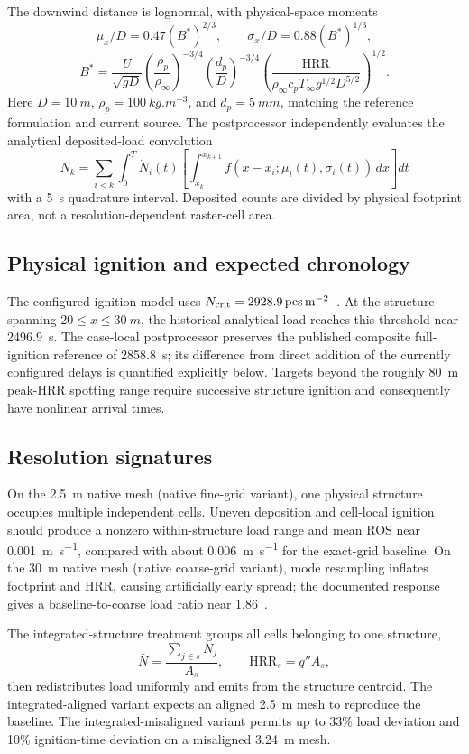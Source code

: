 The downwind distance is lognormal, with physical-space moments
\[
\mu_x/D=0.47(B^*)^{2/3},\qquad \sigma_x/D=0.88(B^*)^{1/3},
\]
\[
B^*=\frac{U}{\sqrt{gD}}
\left(\frac{\rho_p}{\rho_\infty}\right)^{-3/4}
\left(\frac{d_p}{D}\right)^{-3/4}
\left(\frac{\mathrm{HRR}}
{\rho_\infty c_pT_\infty g^{1/2}D^{5/2}}\right)^{1/2}.
\]
Here \(D=\SI{10}{m}\), \(\rho_p=\SI{100}{kg.m^{-3}}\), and
\(d_p=\SI{5}{mm}\), matching the reference formulation and current source. The postprocessor
independently evaluates the analytical deposited-load convolution
\[
N_k=\sum_{i<k}\int_0^T\dot N_i(t)
\left[\int_{x_k}^{x_{k+1}}
f(x-x_i;\mu_i(t),\sigma_i(t))\,dx\right]dt
\]
with a \SI{5}{s} quadrature interval. Deposited counts are divided by physical
footprint area, not a resolution-dependent raster-cell area.

\subsection{Physical ignition and expected chronology}

The configured ignition model uses
\(N_{\rm crit}=\SI{2928.9}{pcs.m^{-2}}\)~\cite{Qin2025}. At the structure
spanning \(20\le x\le\SI{30}{m}\), the historical analytical load reaches
this threshold near \SI{2496.9}{s}. The case-local postprocessor preserves the
published composite full-ignition reference of \SI{2858.8}{s}; its difference
from direct addition of the currently configured delays is quantified
explicitly below.
Targets beyond the roughly \SI{80}{m} peak-HRR spotting range require
successive structure ignition and consequently have nonlinear arrival times.

\subsection{Resolution signatures}

On the \SI{2.5}{m} native mesh (native fine-grid variant), one physical structure occupies
multiple independent cells. Uneven deposition and cell-local ignition should
produce a nonzero within-structure load range and mean ROS near
\SI{0.001}{m.s^{-1}}, compared with about \SI{0.006}{m.s^{-1}} for the
exact-grid baseline.
On the \SI{30}{m} native mesh (native coarse-grid variant), mode resampling inflates footprint
and HRR, causing artificially early spread; the documented response gives a
baseline-to-coarse load ratio near 1.86~\cite{Qin2025}.

The integrated-structure treatment groups all cells belonging to one structure,
\[
\bar N=\frac{\sum_{j\in s}N_j}{A_s},\qquad
\mathrm{HRR}_s=q''A_s,
\]
then redistributes load uniformly and emits from the structure centroid.
The integrated-aligned variant expects an aligned \SI{2.5}{m} mesh to
reproduce the baseline. The integrated-misaligned variant permits up to 33\%
load deviation and 10\% ignition-time deviation
on a misaligned \SI{3.24}{m} mesh.

